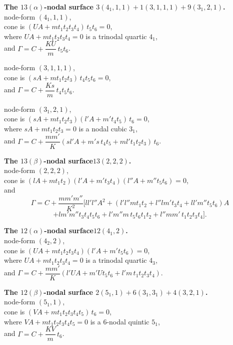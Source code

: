 \documentclass[11pt,a4paper]{article}
\begin{document}
\medskip
\noindent\textbf{The $13(\alpha)$-nodal surface\quad
$3(4_1, 1, 1) + 1(3, 1, 1, 1) + 9(3_1, 2, 1)$.}\\
node-form $(4_1, 1, 1)$,\\
cone is $(UA + m t_1 t_2 t_3 t_4)\, t_5 t_6 = 0$,\\
where $UA + m t_1 t_2 t_3 t_4 = 0$ is a trinodal quartic $4_1$,\\
and $\Gamma = C + \dfrac{K U}{m}\, t_5 t_6$.

\medskip
\noindent node-form $(3, 1, 1, 1)$,\\
cone is $(sA + m t_1 t_2 t_3)\, t_4 t_5 t_6 = 0$,\\
and $\Gamma = C + \dfrac{K s}{m}\, t_4 t_5 t_6$.

\medskip
\noindent node-form $(3_1, 2, 1)$,\\
cone is $(sA + m t_1 t_2 t_3)(l'A + m' t_4 t_5)\, t_6 = 0$,\\
where $sA + m t_1 t_2 t_3 = 0$ is a nodal cubic $3_1$,\\
and $\Gamma = C + \dfrac{m m'}{K}(s l' A + m' s\, t_4 t_5
+ m l' t_1 t_2 t_3)\, t_6$.

\medskip
\noindent\textbf{The $13(\beta)$-nodal surface\quad $13(2, 2, 2)$.}\\
node-form $(2, 2, 2)$,\\
cone is $(lA + m t_1 t_2)(l'A + m' t_3 t_4)(l''A + m'' t_5 t_6) = 0$,\\
and
\[
\Gamma = C + \frac{m m' m''}{K^2}\!\bigl[l l' l'' A^2 + (l' l'' m t_1 t_2
+ l'' l m' t_3 t_4 + l l' m'' t_5 t_6) A
\]
\[
+ l m' m'' t_3 t_4 t_5 t_6 + l' m'' m\, t_5 t_6 t_1 t_2
+ l'' m m'\, t_1 t_2 t_3 t_4 \bigr].
\]

\medskip
\noindent\textbf{The $12(\alpha)$-nodal surface\quad $12(4_1, 2)$.}\\
node-form $(4_2, 2)$,\\
cone is $(UA + m t_1 t_2 t_3 t_4)(l'A + m' t_5 t_6) = 0$,\\
where $UA + m t_1 t_2 t_3 t_4 = 0$ is a trinodal quartic $4_3$,\\
and $\Gamma = C + \dfrac{m m'}{K}(l' U A + m' U t_5 t_6 + l' m\, t_1 t_2 t_3 t_4)$.

\medskip
\noindent\textbf{The $12(\beta)$-nodal surface\quad
$2(5_1, 1) + 6(3_1, 3_1) + 4(3, 2, 1)$.}\\
node-form $(5_1, 1)$,\\
cone is $(VA + m t_1 t_2 t_3 t_4 t_5)\, t_6 = 0$,\\
where $VA + m t_1 t_2 t_3 t_4 t_5 = 0$ is a $6$-nodal quintic $5_1$,\\
and $\Gamma = C + \dfrac{K V}{m}\, t_6$.
\end{document}
